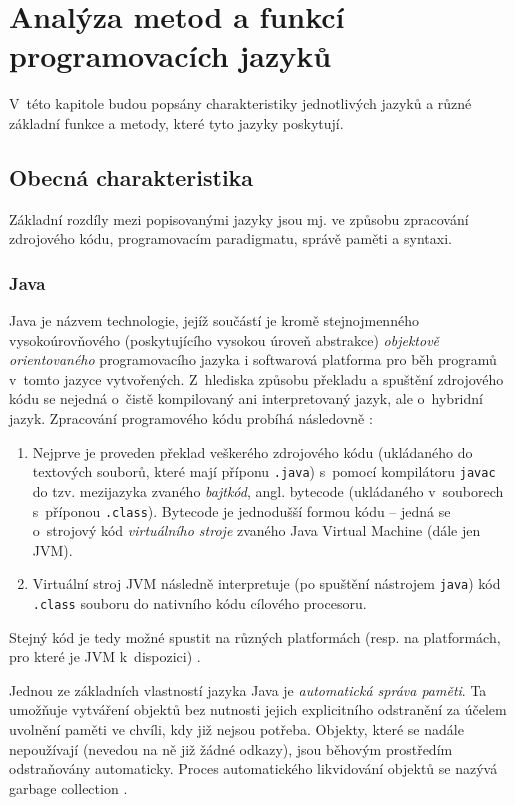 \documentclass[onepage, a4paper, 12pt]{bakalarka}
\begin{document}
\chapter{Analýza metod a funkcí programovacích jazyků}
V~této kapitole budou popsány charakteristiky jednotlivých jazyků a různé základní funkce a metody, které tyto jazyky poskytují. 

\section{Obecná charakteristika}
Základní rozdíly mezi popisovanými jazyky jsou mj. ve způsobu zpracování zdrojového kódu, programovacím paradigmatu, správě paměti a syntaxi.

\subsection{Java}
Java je názvem technologie, jejíž součástí je kromě stejnojmenného vysokoúrovňového (poskytujícího vysokou úroveň abstrakce) \textit{objektově orientovaného} programovacího jazyka i softwarová platforma pro běh programů v~tomto jazyce vytvořených. Z~hlediska způsobu překladu a spuštění zdrojového kódu se nejedná o~čistě kompilovaný ani interpretovaný jazyk, ale o~hybridní jazyk. Zpracování programového kódu probíhá následovně \cite{java-book, java-guide-vm, java-guide-javac, java-guide-java}:
\begin{enumerate}
\item Nejprve je proveden překlad veškerého zdrojového kódu (ukládaného do textových souborů, které mají příponu \texttt{.java}) s~pomocí kompilátoru \texttt{javac} do tzv. mezijazyka zvaného \textit{bajtkód}, angl. bytecode (ukládaného v~souborech s~příponou \texttt{.class}). Bytecode je jednodušší formou kódu -- jedná se o~strojový kód \textit{virtuálního stroje} zvaného Java Virtual Machine (dále jen JVM). 
\item Virtuální stroj JVM následně interpretuje (po spuštění nástrojem \texttt{java}) kód \texttt{.class} souboru do nativního kódu cílového procesoru. 
\end{enumerate}
Stejný kód je tedy možné spustit na různých platformách (resp. na platformách, pro které je JVM k~dispozici) \cite{java-book}.\par
Jednou ze základních vlastností jazyka Java je \textit{automatická správa paměti}. Ta umožňuje vytváření objektů bez nutnosti jejich explicitního odstranění za účelem uvolnění paměti ve chvíli, kdy již nejsou potřeba. Objekty, které se nadále nepoužívají (nevedou na ně již žádné odkazy), jsou běhovým prostředím odstraňovány automaticky. Proces automatického likvidování objektů se nazývá garbage collection \cite{java-book, java-guide-vm}.
\end{document}
